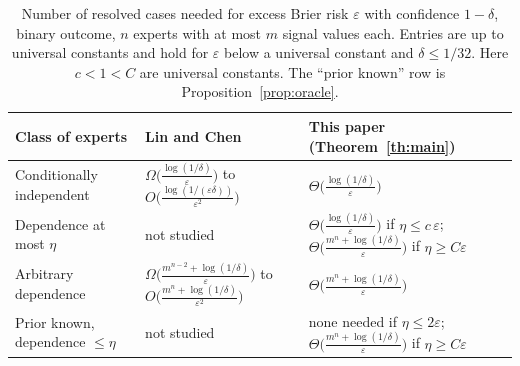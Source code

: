 \documentclass[11pt,a4paper]{article}
\theoremstyle{remark}
\newcommand{\eps}{\varepsilon}
\begin{document}
\begin{table}[h]
\centering\small
\renewcommand{\arraystretch}{1.25}
\begin{tabular}{@{}>{\raggedright\arraybackslash}p{3.0cm}>{\raggedright\arraybackslash}p{4.8cm}>{\raggedright\arraybackslash}p{6.4cm}@{}}
\toprule
Class of experts & Lin and Chen~\cite{lc} & This paper (Theorem~\ref{th:main})\\
\midrule
Conditionally independent & $\Omega\!\big(\tfrac{\log(1/\delta)}{\eps}\big)$ to $O\!\big(\tfrac{\log(1/(\eps\delta))}{\eps^2}\big)$ & $\Theta\!\big(\tfrac{\log(1/\delta)}{\eps}\big)$\\
Dependence at most $\eta$ & not studied & $\Theta\!\big(\tfrac{\log(1/\delta)}{\eps}\big)$ if $\eta\le c\,\eps$; $\Theta\!\big(\tfrac{m^n+\log(1/\delta)}{\eps}\big)$ if $\eta\ge C\eps$\\
Arbitrary dependence & $\Omega\!\big(\tfrac{m^{n-2}+\log(1/\delta)}{\eps}\big)$ to $O\!\big(\tfrac{m^n+\log(1/\delta)}{\eps^2}\big)$ & $\Theta\!\big(\tfrac{m^n+\log(1/\delta)}{\eps}\big)$\\
Prior known, dependence $\le\eta$ & not studied & none needed if $\eta\le2\eps$; $\Theta\!\big(\tfrac{m^n+\log(1/\delta)}{\eps}\big)$ if $\eta\ge C\eps$\\
\bottomrule
\end{tabular}
\caption{Number of resolved cases needed for excess Brier risk $\eps$ with confidence $1-\delta$, binary outcome, $n$ experts with at most $m$ signal values each. Entries are up to universal constants and hold for $\eps$ below a universal constant and $\delta\le1/32$. Here $c<1<C$ are universal constants. The ``prior known'' row is Proposition~\ref{prop:oracle}.}
\label{tab:known}
\end{table}
\end{document}
